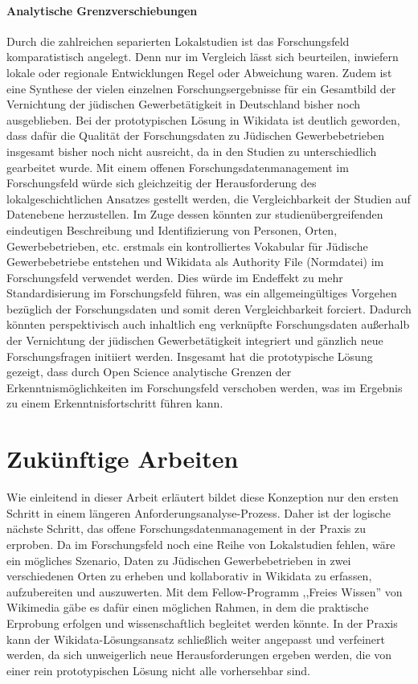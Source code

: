 \paragraph{Analytische Grenzverschiebungen} Durch die zahlreichen separierten Lokalstudien ist das Forschungsfeld komparatistisch angelegt. Denn nur im Vergleich lässt sich beurteilen, inwiefern lokale oder regionale Entwicklungen Regel oder Abweichung waren. Zudem ist eine Synthese der vielen einzelnen Forschungsergebnisse für ein Gesamtbild der Vernichtung der jüdischen Gewerbetätigkeit in Deutschland bisher noch ausgeblieben. Bei der prototypischen Lösung in Wikidata ist deutlich geworden, dass dafür die Qualität der Forschungsdaten zu Jüdischen Gewerbebetrieben insgesamt bisher noch nicht ausreicht, da in den Studien zu unterschiedlich gearbeitet wurde. Mit einem offenen Forschungsdatenmanagement im Forschungsfeld würde sich gleichzeitig der Herausforderung des lokalgeschichtlichen Ansatzes gestellt werden, die Vergleichbarkeit der Studien auf Datenebene herzustellen. Im Zuge dessen könnten zur studienübergreifenden eindeutigen Beschreibung und Identifizierung von Personen, Orten, Gewerbebetrieben, etc. erstmals ein kontrolliertes Vokabular für Jüdische Gewerbebetriebe entstehen und Wikidata als Authority File (Normdatei) im Forschungsfeld verwendet werden. Dies würde im Endeffekt zu mehr Standardisierung im Forschungsfeld führen, was ein allgemeingültiges Vorgehen bezüglich der Forschungsdaten und somit deren Vergleichbarkeit forciert. Dadurch könnten perspektivisch auch inhaltlich eng verknüpfte Forschungsdaten außerhalb der Vernichtung der jüdischen Gewerbetätigkeit integriert und gänzlich neue Forschungsfragen initiiert werden. Insgesamt hat die prototypische Lösung gezeigt, dass durch Open Science analytische Grenzen der Erkenntnismöglichkeiten im Forschungsfeld verschoben werden, was im Ergebnis zu einem Erkenntnisfortschritt führen kann.

\section{Zukünftige Arbeiten}

Wie einleitend in dieser Arbeit erläutert bildet diese Konzeption nur den ersten Schritt in einem längeren Anforderungsanalyse-Prozess. Daher ist der logische nächste Schritt, das offene Forschungsdatenmanagement in der Praxis zu erproben. Da im Forschungsfeld noch eine Reihe von Lokalstudien fehlen, wäre ein mögliches Szenario, Daten zu Jüdischen Gewerbebetrieben in zwei verschiedenen Orten zu erheben und kollaborativ in Wikidata zu erfassen, aufzubereiten und auszuwerten. Mit dem Fellow-Programm ,,Freies Wissen'' von Wikimedia gäbe es dafür einen möglichen Rahmen, in dem die praktische Erprobung erfolgen und wissenschaftlich begleitet werden könnte. In der Praxis kann der Wikidata-Lösungsansatz schließlich weiter angepasst und verfeinert werden, da sich unweigerlich neue Herausforderungen ergeben werden, die von einer rein prototypischen Lösung nicht alle vorhersehbar sind. 

